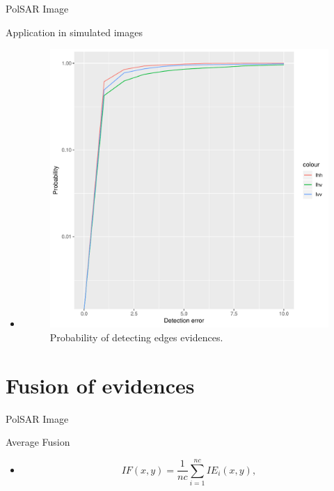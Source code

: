 \documentclass[10pt]{beamer}
\begin{document}
\begin{frame}[fragile]{PolSAR Image}
\begin{alertblock}{Application in simulated images}
\begin{itemize}
	\item 
	\begin{figure}[hbt]
	\centering
	\includegraphics[width=.5\linewidth]{metricas_ihh_ivh_ivv_nhfc_artigos}%
	\caption{Probability of detecting edges evidences.}
\label{probability_edge_detc}
\end{figure}
\end{itemize}
\end{alertblock}
\end{frame}

\section{Fusion of evidences}

\begin{frame}[fragile]{PolSAR Image}
\begin{alertblock}{Average Fusion}
\begin{itemize}
	\item 
	\begin{equation}
	IF(x,y)=\frac{1}{nc}\sum_{i=1}^{nc}IE_i(x,y),
\end{equation} 	
\end{itemize}
\end{alertblock}
\end{frame}
\end{document}
